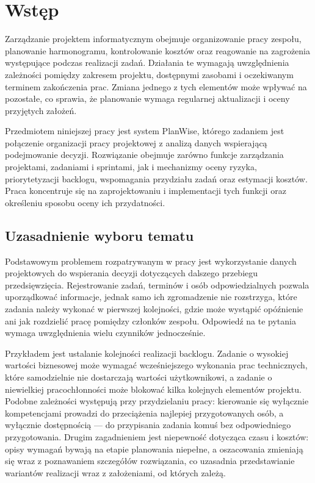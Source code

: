 \chapter{Wstęp}

Zarządzanie projektem informatycznym obejmuje organizowanie pracy zespołu, planowanie harmonogramu, kontrolowanie kosztów oraz reagowanie na zagrożenia występujące podczas realizacji zadań. Działania te wymagają uwzględnienia zależności pomiędzy zakresem projektu, dostępnymi zasobami i oczekiwanym terminem zakończenia prac. Zmiana jednego z tych elementów może wpływać na pozostałe, co sprawia, że planowanie wymaga regularnej aktualizacji i oceny przyjętych założeń.

Przedmiotem niniejszej pracy jest system PlanWise, którego zadaniem jest połączenie organizacji pracy projektowej z analizą danych wspierającą podejmowanie decyzji. Rozwiązanie obejmuje zarówno funkcje zarządzania projektami, zadaniami i sprintami, jak i mechanizmy oceny ryzyka, priorytetyzacji backlogu, wspomagania przydziału zadań oraz estymacji kosztów. Praca koncentruje się na zaprojektowaniu i implementacji tych funkcji oraz określeniu sposobu oceny ich przydatności.

\section{Uzasadnienie wyboru tematu}

Podstawowym problemem rozpatrywanym w pracy jest wykorzystanie danych projektowych do wspierania decyzji dotyczących dalszego przebiegu przedsięwzięcia. Rejestrowanie zadań, terminów i osób odpowiedzialnych pozwala uporządkować informacje, jednak samo ich zgromadzenie nie rozstrzyga, które zadania należy wykonać w pierwszej kolejności, gdzie może wystąpić opóźnienie ani jak rozdzielić pracę pomiędzy członków zespołu. Odpowiedź na te pytania wymaga uwzględnienia wielu czynników jednocześnie.

Przykładem jest ustalanie kolejności realizacji backlogu. Zadanie o wysokiej wartości biznesowej może wymagać wcześniejszego wykonania prac technicznych, które samodzielnie nie dostarczają wartości użytkownikowi, a zadanie o niewielkiej pracochłonności może blokować kilka kolejnych elementów projektu. Podobne zależności występują przy przydzielaniu pracy: kierowanie się wyłącznie kompetencjami prowadzi do przeciążenia najlepiej przygotowanych osób, a wyłącznie dostępnością — do przypisania zadania komuś bez odpowiedniego przygotowania. Drugim zagadnieniem jest niepewność dotycząca czasu i kosztów: opisy wymagań bywają na etapie planowania niepełne, a oszacowania zmieniają się wraz z poznawaniem szczegółów rozwiązania, co uzasadnia przedstawianie wariantów realizacji wraz z założeniami, od których zależą.

